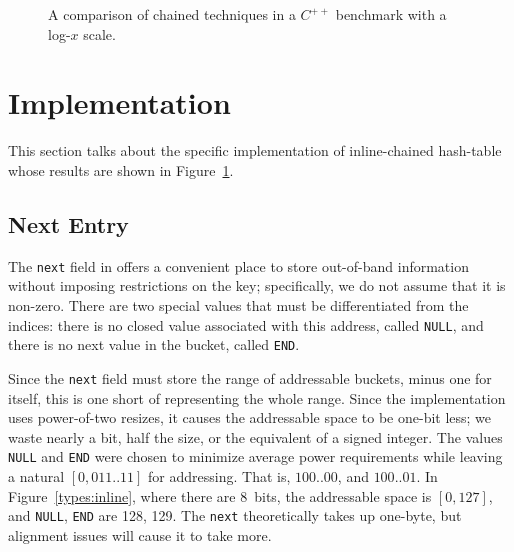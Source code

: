 \documentclass[12pt]{article}
\newcommand{\code}[1]{\colorbox{light-gray}{\texttt{#1}}}
\begin{document}
\begin{figure}%
\centering%
\caption{A comparison of chained techniques in a $C^{++}$ benchmark with a log-$x$ scale.}%
\label{timing}%
\end{figure}%

\section{Implementation}

This section talks about the specific implementation of inline-chained hash-table whose results are shown in Figure~\ref{timing}.

\subsection{Next Entry}

The \code{next} field in offers a convenient place to store out-of-band information without imposing restrictions on the key; specifically, we do not assume that it is non-zero. There are two special values that must be differentiated from the indices: there is no closed value associated with this address, called \code{NULL}, and there is no next value in the bucket, called \code{END}.

Since the \code{next} field must store the range of addressable buckets, minus one for itself, this is one short of representing the whole range. Since the implementation uses power-of-two resizes, it causes the addressable space to be one-bit less; we waste nearly a bit, half the size, or the equivalent of a signed integer. The values \code{NULL} and \code{END} were chosen to minimize average power requirements while leaving a natural $[0, 011..11]$ for addressing. That is, $100..00$, and $100..01$. In Figure~\ref{types:inline}, where there are 8~bits, the addressable space is $[0, 127]$, and \code{NULL}, \code{END} are 128, 129. The \code{next} theoretically takes up one-byte, but alignment issues will cause it to take more.
\end{document}
